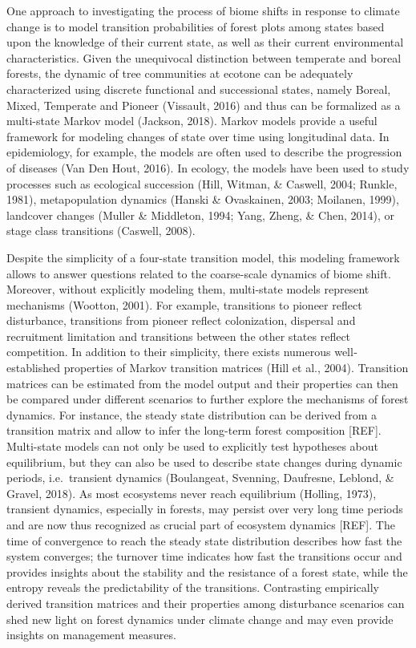 \documentclass[a4paperpaper,]{article}
\begin{document}
One approach to investigating the process of biome shifts in response to
climate change is to model transition probabilities of forest plots
among states based upon the knowledge of their current state, as well as
their current environmental characteristics. Given the unequivocal
distinction between temperate and boreal forests, the dynamic of tree
communities at ecotone can be adequately characterized using discrete
functional and successional states, namely Boreal, Mixed, Temperate and
Pioneer (Vissault, 2016) and thus can be formalized as a multi-state
Markov model (Jackson, 2018). Markov models provide a useful framework
for modeling changes of state over time using longitudinal data. In
epidemiology, for example, the models are often used to describe the
progression of diseases (Van Den Hout, 2016). In ecology, the models
have been used to study processes such as ecological succession (Hill,
Witman, \& Caswell, 2004; Runkle, 1981), metapopulation dynamics (Hanski
\& Ovaskainen, 2003; Moilanen, 1999), landcover changes (Muller \&
Middleton, 1994; Yang, Zheng, \& Chen, 2014), or stage class transitions
(Caswell, 2008).

Despite the simplicity of a four-state transition model, this modeling
framework allows to answer questions related to the coarse-scale
dynamics of biome shift. Moreover, without explicitly modeling them,
multi-state models represent mechanisms (Wootton, 2001). For example,
transitions to pioneer reflect disturbance, transitions from pioneer
reflect colonization, dispersal and recruitment limitation and
transitions between the other states reflect competition. In addition to
their simplicity, there exists numerous well‐established properties of
Markov transition matrices (Hill et al., 2004). Transition matrices can
be estimated from the model output and their properties can then be
compared under different scenarios to further explore the mechanisms of
forest dynamics. For instance, the steady state distribution can be
derived from a transition matrix and allow to infer the long-term forest
composition {[}REF{]}. Multi-state models can not only be used to
explicitly test hypotheses about equilibrium, but they can also be used
to describe state changes during dynamic periods, i.e.~transient
dynamics (Boulangeat, Svenning, Daufresne, Leblond, \& Gravel, 2018). As
most ecosystems never reach equilibrium (Holling, 1973), transient
dynamics, especially in forests, may persist over very long time periods
and are now thus recognized as crucial part of ecosystem dynamics
{[}REF{]}. The time of convergence to reach the steady state
distribution describes how fast the system converges; the turnover time
indicates how fast the transitions occur and provides insights about the
stability and the resistance of a forest state, while the entropy
reveals the predictability of the transitions. Contrasting empirically
derived transition matrices and their properties among disturbance
scenarios can shed new light on forest dynamics under climate change and
may even provide insights on management measures.
\end{document}
